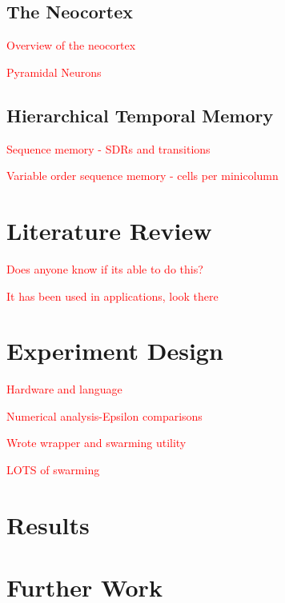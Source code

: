 \documentclass[fleqn,minimal]{article}
\newcommand\blankpage{
	\pagebreak
	\ifthispageodd{\null
		\vfill
		\vfill
		\thispagestyle{empty}
		\clearpage}{}
}
\begin{document}
	\subsection{The Neocortex}
	
	\textcolor{red}{Overview of the neocortex}
	
	\textcolor{red}{Pyramidal Neurons}
	
	\subsection{Hierarchical Temporal Memory}
	
	\textcolor{red}{Sequence memory - SDRs and transitions}
	
	\textcolor{red}{Variable order sequence memory - cells per minicolumn}
	
	\section{Literature Review}
	
	\textcolor{red}{Does anyone know if its able to do this?}
	
	\textcolor{red}{It has been used in applications, look there}
	
	\section{Experiment Design}
	
	\textcolor{red}{Hardware and language}
	
	\textcolor{red}{Numerical analysis-Epsilon comparisons}
	
	\textcolor{red}{Wrote wrapper and swarming utility}
	
	\textcolor{red}{LOTS of swarming}
	
	\section{Results}
	
	\section{Further Work}
	
	
	\blankpage
	
	\nocite{*}  %
	{}
	
\end{document}
